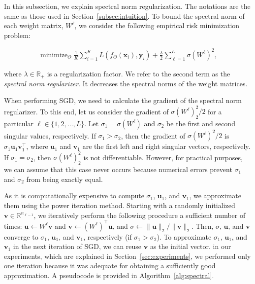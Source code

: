In this subsection, we explain spectral norm regularization. The notations are the same as those used in Section~\ref{subsec:intuition}.
To bound the spectral norm of each weight matrix, $W^\ell$, we consider the following empirical risk minimization problem:

\begin{align}
  \mathop{\text{minimize}}_{\Theta} \frac{1}{K}\sum_{i=1}^K L(f_\Theta({\bm x}_i),{\bm y}_i) + \frac{\lambda}{2} \sum_{\ell=1}^L \sigma(W^\ell)^2,
  \label{eq:spectral}
\end{align}

where $\lambda \in \mathbb{R}_+$ is a regularization factor. We refer to the second term as the \emph{spectral norm regularizer}. It decreases the spectral norms of the weight matrices.

When performing SGD, we need to calculate the gradient of the spectral norm regularizer. To this end, let us consider the gradient of $\sigma(W^\ell)^2_2/2$ for a particular $\ell \in \{1,2,\ldots,L\}$.
Let $\sigma_1 = \sigma(W^\ell)$ and $\sigma_2$ be the first and second singular values, respectively. If $\sigma_1 > \sigma_2$, then the gradient of $\sigma(W^\ell)^2/2$ is $\sigma_1 {\bm u}_1{\bm v}_1^\top$, where ${\bm u}_1$ and ${\bm v}_1$ are the first left and right singular vectors, respectively. If $\sigma_1 = \sigma_2$, then $\sigma(W^\ell)^2_2$ is not differentiable. However, for practical purposes, we can assume that this case never occurs because numerical errors prevent $\sigma_1 $ and $\sigma_2$ from being exactly equal.

As it is computationally expensive to compute $\sigma_1$, ${\bm u}_1$, and ${\bm v}_1$, we approximate them using the power iteration method. Starting with a randomly initialized ${\bm v} \in \mathbb{R}^{n_{\ell-1}}$, we iteratively perform the following procedure a sufficient number of times: ${\bm u} \leftarrow W^\ell {\bm v}$ and ${\bm v} \leftarrow (W^\ell)^\top {\bm u}$, and $\sigma \leftarrow \|{\bm u}\|_2/\|{\bm v}\|_2$.
Then, $\sigma$, ${\bm u}$, and ${\bm v}$ converge to $\sigma_1$, ${\bm u}_1$, and ${\bm v}_1$, respectively (if $\sigma_1 > \sigma_2$).
To approximate $\sigma_1$, ${\bm u}_1$, and ${\bm v}_1$ in the next iteration of SGD, we can reuse ${\bm v}$ as the initial vector. in our experiments, which are explained in Section~\ref{sec:experiments}, we performed only one iteration because it was adequate for obtaining a sufficiently good approximation. A pseudocode is provided in Algorithm~\ref{alg:spectral}.

